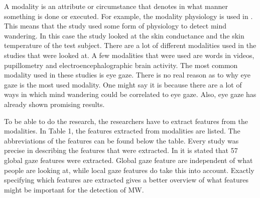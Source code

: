 A modality is an attribute or circumstance that denotes in what manner something is done or executed. For example, the modality physiology is used in \cite{Blanchard2014AutomatedLearning}. This means that the study used some form of physiology to detect mind wandering. In this case the study looked at the skin conductance and the skin temperature of the test subject. There are a lot of different modalities used in the studies that were looked at. A few modalities that were used are words in videos, pupillometry and electroencephalographic brain activity. The most common modality used in these studies is eye gaze. There is no real reason as to why eye gaze is the most used modality. One might say it is because there are a lot of ways in which mind wandering could be correlated to eye gaze. Also, eye gaze has already shown promising results.

To be able to do the research, the researchers have to extract features from the modalities. In Table 1, the features extracted from modalities are listed. The abbreviations of the features can be found below the table. Every study was precise in describing the features that were extracted. In \cite{Hutt2017OutClassroom} it is stated that 57 global gaze features were extracted. Global gaze feature are independent of what people are looking at, while local gaze features do take this into account. Exactly specifying which features are extracted gives a better overview of what features might be important for the detection of MW.